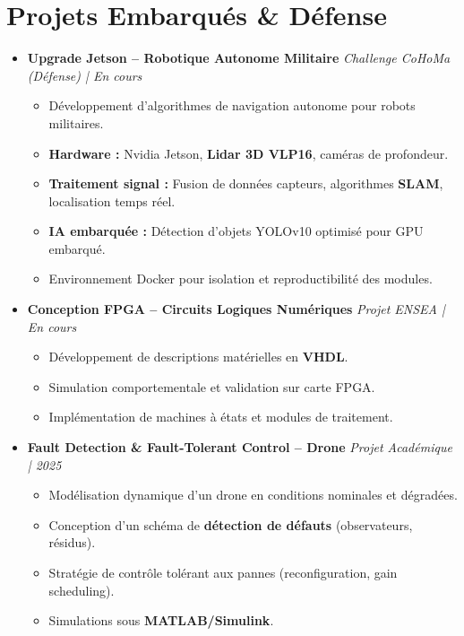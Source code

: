 \documentclass[a4paper,11pt]{article}
\begin{document}
\section{Projets Embarqués \& Défense}
\begin{itemize}[leftmargin=*, label={-}]

\item \textbf{Upgrade Jetson -- Robotique Autonome Militaire} \hfill \textit{Challenge CoHoMa (Défense) | En cours}
\vspace{-2pt}
    \begin{itemize}[leftmargin=0.4cm, nosep, label=\tiny$\bullet$]
        \item \small{Développement d'algorithmes de navigation autonome pour robots militaires.}
        \item \small{\textbf{Hardware :} Nvidia Jetson, \textbf{Lidar 3D VLP16}, caméras de profondeur.}
        \item \small{\textbf{Traitement signal :} Fusion de données capteurs, algorithmes \textbf{SLAM}, localisation temps réel.}
        \item \small{\textbf{IA embarquée :} Détection d'objets YOLOv10 optimisé pour GPU embarqué.}
        \item \small{Environnement Docker pour isolation et reproductibilité des modules.}
    \end{itemize}
\vspace{3pt}

\item \textbf{Conception FPGA -- Circuits Logiques Numériques} \hfill \textit{Projet ENSEA | En cours}
\vspace{-2pt}
    \begin{itemize}[leftmargin=0.4cm, nosep, label=\tiny$\bullet$]
        \item \small{Développement de descriptions matérielles en \textbf{VHDL}.}
        \item \small{Simulation comportementale et validation sur carte FPGA.}
        \item \small{Implémentation de machines à états et modules de traitement.}
    \end{itemize}
\vspace{3pt}

\item \textbf{Fault Detection \& Fault-Tolerant Control -- Drone} \hfill \textit{Projet Académique | 2025}
\vspace{-2pt}
    \begin{itemize}[leftmargin=0.4cm, nosep, label=\tiny$\bullet$]
        \item \small{Modélisation dynamique d'un drone en conditions nominales et dégradées.}
        \item \small{Conception d'un schéma de \textbf{détection de défauts} (observateurs, résidus).}
        \item \small{Stratégie de contrôle tolérant aux pannes (reconfiguration, gain scheduling).}
        \item \small{Simulations sous \textbf{MATLAB/Simulink}.}
    \end{itemize}
\vspace{3pt}


\end{itemize}
\end{document}
